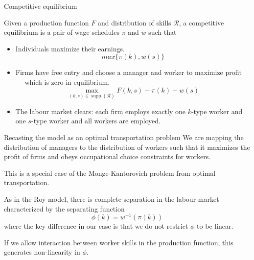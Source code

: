 \documentclass{beamer}
\DeclareMathOperator\supp{supp}
\begin{document}
		
	\begin{frame}{Competitive equilibrium}
		
		\begin{definition}
			Given a production function $F$ and distribution of skills $\mathcal{R}$, a competitive equilibrium is a pair of wage schedules $\pi$ and $w$ such that
			\smallskip
			\begin{itemize}
				\item Individuals maximize their earnings.
				 $$ max\{\pi(k),w(s)\} $$
				\item Firms have free entry and choose a manager and worker to maximize profit --- which is zero in equilibrium.
				$$ \max_{(k,s)\in\supp(\mathcal{R})} F(k,s) - \pi(k) - w(s) $$
				\item The labour market clears: each firm employs exactly one $k$-type worker and one $s$-type worker and all workers are employed. 
			\end{itemize}
		\end{definition}
		
	\end{frame}
	
	\begin{frame}{Recasting the model as an optimal transportation problem}
		We are mapping the distribution of managers to the distribution of workers such that it maximizes the profit of firms and obeys occupational choice constraints for workers.
		
		\bigskip
		
		This is a special case of the Monge-Kantorovich problem from optimal transportation.
		
		\bigskip
		
		As in the Roy model, there is complete separation in the labour market characterized by the separating function 
		\begin{equation*}
			\phi(k) = w^{-1}(\pi(k))
		\end{equation*}
		where the key difference in our case is that we do not restrict $\phi$ to be linear.
		
		\bigskip
		
		 If we allow interaction between worker skills in the production function, this generates non-linearity in $\phi$.
	\end{frame}
	
\end{document}
